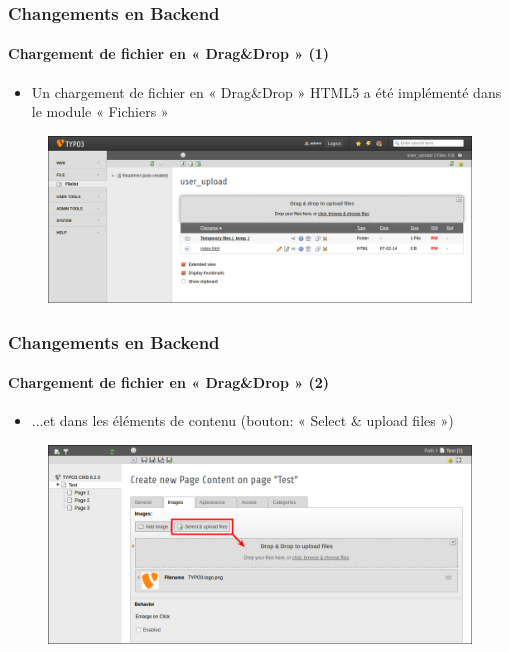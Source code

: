 
\begin{frame}[fragile]
	\frametitle{Changements en Backend}
	\framesubtitle{Chargement de fichier en « Drag\&Drop » (1)}

	\begin{itemize}
		\item Un chargement de fichier en « Drag\&Drop » HTML5 a été implémenté dans le module « Fichiers »
	\end{itemize}

	\begin{figure}
		\includegraphics[width=0.95\linewidth]{Images/BackendChanges/DragDropFileUpload.png}
	\end{figure}

\end{frame}


\begin{frame}[fragile]
	\frametitle{Changements en Backend}
	\framesubtitle{Chargement de fichier en « Drag\&Drop » (2)}

	\begin{itemize}
		\item ...et dans les éléments de contenu (bouton: « Select \& upload files »)

	\end{itemize}

	\begin{figure}
		\includegraphics[width=0.95\linewidth]{Images/BackendChanges/SelectAndUploadFiles.png}
	\end{figure}

\end{frame}

